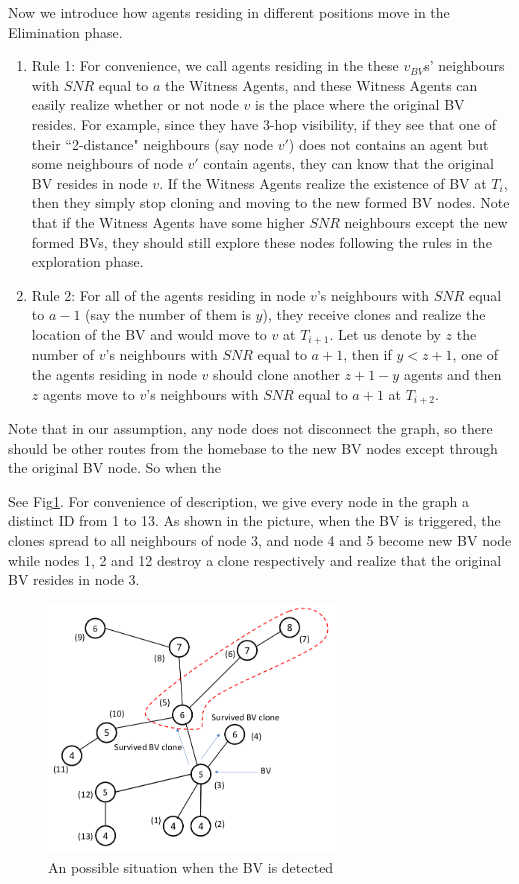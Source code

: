 Now we introduce how agents residing in different positions move in the Elimination phase.
\begin{enumerate}

\item Rule 1: For convenience, we call agents residing in the these $v_{BV}$s' neighbours with $SNR$ equal to $a$ the Witness Agents, and these Witness Agents can easily realize whether or not node $v$ is the place where the original BV resides. For example, since they have 3-hop visibility, if they see that one of their ``2-distance" neighbours (say node $v'$) does not contains an agent but some neighbours of node $v'$ contain agents, they can know that the original BV resides in node $v$. If the Witness Agents realize the existence of BV at $T_i$, then they simply stop cloning and moving to the new formed BV nodes. Note that if the Witness Agents have some higher $SNR$ neighbours except the new formed BVs, they should still explore these nodes following the rules in the exploration phase.  

\item Rule 2: For all of the agents residing in node $v$'s neighbours with $SNR$ equal to $a-1$ (say the number of them is $y$), they receive clones and realize the location of the BV and would move to $v$ at $T_{i+1}$. Let us denote by $z$ the number of $v$'s neighbours with $SNR$ equal to $a+1$, then if $y< z+1$, one of the agents residing in node $v$ should clone another $z+1-y$ agents and then $z$ agents move to $v$'s neighbours with $SNR$ equal to $a+1$ at $T_{i+2}$.
\end{enumerate}

Note that in our assumption, any node does not disconnect the graph, so there should be other routes from the homebase to the new BV nodes except through the original BV node. So when the  

   
See Fig\ref{fig:Arbi3}. For convenience of description, we give every node in the graph a distinct ID from 1 to 13. As shown in the picture, when the BV is triggered, the clones spread to all neighbours of node 3, and node 4 and 5 become new BV node while nodes 1, 2 and 12 destroy a clone respectively and realize that the original BV resides in node 3. 

\begin{figure}[H]
  \centering  
  \includegraphics[width=3in]{figures/Arbi3.png}
  \caption{An possible situation when the BV is detected}\label{fig:Arbi3}
\end{figure}    

